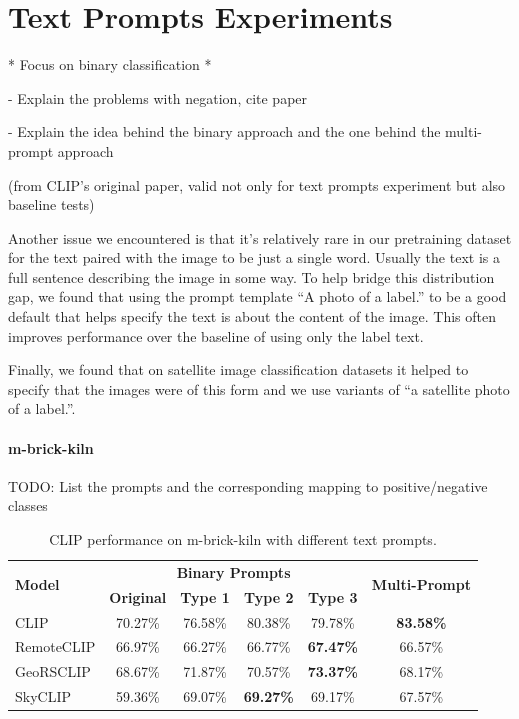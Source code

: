 \documentclass[a4paper, oneside, english]{sapthesis} %
\begin{document}
\section{Text Prompts Experiments}

* Focus on binary classification *

- Explain the problems with negation, cite paper \cite{quantmeyer2024and}

- Explain the idea behind the binary approach and the one behind the multi-prompt approach

(from CLIP's original paper, valid not only for text prompts experiment but also baseline tests)

Another issue we encountered is that it’s relatively rare in our pretraining dataset for the text paired with the image to be just a single word. Usually the text is a full sentence describing the image in some way. To help bridge this distribution gap, we found that using the prompt template “A photo of a {label}.” to be a good default that helps specify the text is about the content of the image. This often improves performance over the baseline of using only the label text.

Finally, we found that on satellite image classification datasets it helped to specify that the images were of this form and we use variants of “a satellite photo of a {label}.”.


\paragraph{m-brick-kiln}

TODO: List the prompts and the corresponding mapping to positive/negative classes


\begin{table}[ht]
\centering
\footnotesize
\renewcommand{\arraystretch}{1.2}
    \begin{tabular}{lc|cccc}
    \toprule
    \multirow{2}{*}{\textbf{Model}} & \multicolumn{4}{c}{\textbf{Binary Prompts}} &  \multirow{2}{*}{\textbf{Multi-Prompt}}\\
    \cmidrule(lr){2-5}
    & \textbf{Original} & \textbf{Type 1} & \textbf{Type 2} & \textbf{Type 3} \\
    \midrule
    CLIP & 70.27\% & 76.58\% & 80.38\% & 79.78\% & \textbf{83.58\%} \\
    RemoteCLIP & 66.97\% & 66.27\% & 66.77\% & \textbf{67.47\%} & 66.57\% \\
    GeoRSCLIP & 68.67\% & 71.87\% & 70.57\% & \textbf{73.37\%} & 68.17\%\\
    SkyCLIP & 59.36\% & 69.07\% & \textbf{69.27\%} & 69.17\% & 67.57\% \\ 
    \bottomrule
    \end{tabular}
\vspace{0.3cm}
\caption{\normalsize CLIP performance on m-brick-kiln with different text prompts.}
\label{tab:prompts1}
\end{table}
\end{document}
